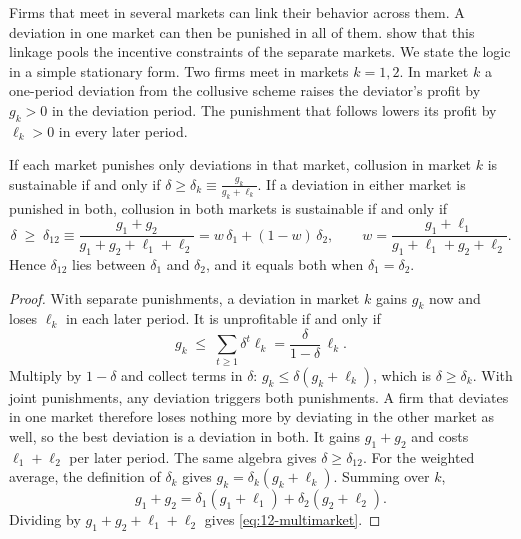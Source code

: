 Firms that meet in several markets can link their behavior across them. A deviation in one market can then be
punished in all of them. \citet{BernheimWhinston1990} show that this linkage pools the incentive constraints of the
separate markets. We state the logic in a simple stationary form. Two firms meet in markets $k = 1, 2$. In market
$k$ a one-period deviation from the collusive scheme raises the deviator's profit by $g_k > 0$ in the deviation
period. The punishment that follows lowers its profit by $\ell_k > 0$ in every later period.

\begin{proposition}\label{prop:12-multimarket}
If each market punishes only deviations in that market, collusion in market $k$ is sustainable if and only if
$\delta \ge \delta_k \equiv \frac{g_k}{g_k + \ell_k}$. If a deviation in either market is punished in both, collusion
in both markets is sustainable if and only if
\begin{equation}\label{eq:12-multimarket}
  \delta \;\ge\; \delta_{12} \equiv \frac{g_1 + g_2}{g_1 + g_2 + \ell_1 + \ell_2} = w\,\delta_1 + (1-w)\,\delta_2,
  \qquad w = \frac{g_1 + \ell_1}{g_1 + \ell_1 + g_2 + \ell_2} .
\end{equation}
Hence $\delta_{12}$ lies between $\delta_1$ and $\delta_2$, and it equals both when $\delta_1 = \delta_2$.
\end{proposition}

\begin{proof}
With separate punishments, a deviation in market $k$ gains $g_k$ now and loses $\ell_k$ in each later period. It
is unprofitable if and only if
\begin{equation*}
  g_k \;\le\; \sum_{t \ge 1}\delta^t\ell_k = \frac{\delta}{1-\delta}\,\ell_k .
\end{equation*}
Multiply by $1 - \delta$ and collect terms in $\delta$: $g_k \le \delta(g_k + \ell_k)$, which is
$\delta \ge \delta_k$. With joint punishments, any deviation triggers both punishments. A firm that deviates in one
market therefore loses nothing more by deviating in the other market as well, so the best deviation is a
deviation in both. It gains $g_1 + g_2$ and costs $\ell_1 + \ell_2$ per later period. The same algebra gives
$\delta \ge \delta_{12}$. For the weighted average, the definition of $\delta_k$ gives
$g_k = \delta_k(g_k + \ell_k)$. Summing over $k$,
\begin{equation*}
  g_1 + g_2 = \delta_1(g_1 + \ell_1) + \delta_2(g_2 + \ell_2) .
\end{equation*}
Dividing by $g_1 + g_2 + \ell_1 + \ell_2$ gives \eqref{eq:12-multimarket}.
\end{proof}


